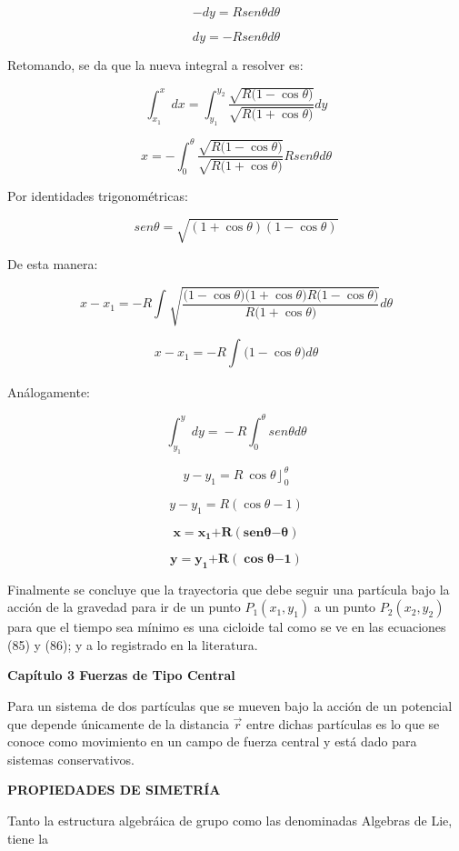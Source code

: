\documentclass[]{article}
\begin{document}
\[- dy = R{sen}\theta d\theta\]

\[dy = - R{sen}\theta d\theta\]

Retomando, se da que la nueva integral a resolver es:

\[\int_{x_{1}}^{x}{dx =}\int_{y_{1}}^{y_{2}}\frac{\sqrt{R(1 - \cos{\theta)}}}{\sqrt{R(1 + \cos{\theta)}}}dy\]

\[x = - \int_{0}^{\theta}\frac{\sqrt{R(1 - \cos{\theta)}}}{\sqrt{R(1 + \cos{\theta)}}}R{sen}\theta d\theta\]

Por identidades trigonométricas:

\[{sen}\theta = \sqrt{\left( 1 + \cos\theta \right)\left( 1 - \cos\theta \right)}\]

De esta manera:

\[x - x_{1} = - R\int_{}^{}\sqrt{\frac{(1 - \cos{\theta)}(1 + \cos{\theta)}R(1 - \cos{\theta)}}{R(1 + \cos{\theta)}}}d\theta\]

\[x - x_{1} = - R\int_{}^{}{(1 - \cos{\theta)}}d\theta\]

Análogamente:

\[\int_{y_{1}}^{y}{dy =} - R\int_{0}^{\theta}{{sen}\theta}d\theta\]

\[y - y_{1} = R\left. \ \cos\theta \right\rfloor_{0}^{\theta}\]

\[y - y_{1} = R\left( \cos\theta - 1 \right)\]

\[\mathbf{x =}\mathbf{x}_{\mathbf{1}}\mathbf{+ R}\left( \mathbf{sen}\mathbf{\theta}\mathbf{- \theta} \right)\]

\[\mathbf{y =}\mathbf{y}_{\mathbf{1}}\mathbf{+ R}\left( \mathbf{\cos}\mathbf{\theta}\mathbf{- 1} \right)\]

Finalmente se concluye que la trayectoria que debe seguir una partícula
bajo la acción de la gravedad para ir de un punto \(P_{1}(x_{1},y_{1})\)
a un punto \(P_{2}(x_{2},y_{2})\) para que el tiempo sea mínimo es una
cicloide tal como se ve en las ecuaciones (85) y (86); y a lo registrado
en la literatura.

\textbf{Capítulo 3 Fuerzas de Tipo Central}

Para un sistema de dos partículas que se mueven bajo la acción de un
potencial que depende únicamente de la distancia \(\overrightarrow{r}\)
entre dichas partículas es lo que se conoce como movimiento en un campo
de fuerza central y está dado para sistemas conservativos.

\textbf{PROPIEDADES DE SIMETRÍA}

Tanto la estructura algebráica de grupo como las denominadas Algebras de
Lie, tiene la
\end{document}
